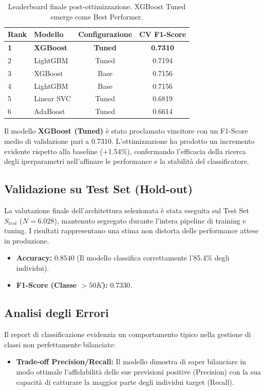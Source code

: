 \begin{table}[h]
\centering
\begin{tabular}{llcc}
\toprule
\textbf{Rank} & \textbf{Modello} & \textbf{Configurazione} & \textbf{CV F1-Score} \\
\midrule
\textbf{1} & \textbf{XGBoost} & \textbf{Tuned} & \textbf{0.7310} \\
2 & LightGBM & Tuned & 0.7194 \\
3 & XGBoost & Base & 0.7156 \\
4 & LightGBM & Base & 0.7156 \\
5 & Linear SVC & Tuned & 0.6819 \\
6 & AdaBoost & Tuned & 0.6614 \\
\bottomrule
\end{tabular}
\caption{Leaderboard finale post-ottimizzazione. XGBoost Tuned emerge come Best Performer.}
\label{tab:final_ranking}
\end{table}

\noindent
Il modello \textbf{XGBoost (Tuned)} è stato proclamato vincitore con un F1-Score medio di validazione pari a 0.7310. L'ottimizzazione ha prodotto un incremento evidente rispetto alla baseline (+1.54\%), confermando l'efficacia della ricerca degli iperparametri nell'affinare le performance e la stabilità del classificatore.

\subsection{Validazione su Test Set (Hold-out)}

La valutazione finale dell'architettura selezionata è stata eseguita sul Test Set \(S_{test}\) (\(N=6.028\)), mantenuto segregato durante l'intera pipeline di training e tuning. I risultati rappresentano una stima non distorta delle performance attese in produzione.

\begin{itemize}
    \item \textbf{Accuracy:} \(0.8540\) (Il modello classifica correttamente l'85.4\% degli individui).
    \item \textbf{F1-Score (Classe \(>50K\)):} \(0.7330\).
\end{itemize}

\subsection{Analisi degli Errori}
Il report di classificazione evidenzia un comportamento tipico nella gestione di classi non perfettamente bilanciate:
\begin{itemize}
    \item \textbf{Trade-off Precision/Recall:} Il modello dimostra di saper bilanciare in modo ottimale l'affidabilità delle sue previsioni positive (Precision) con la sua capacità di catturare la maggior parte degli individui target (Recall).
\end{itemize}


